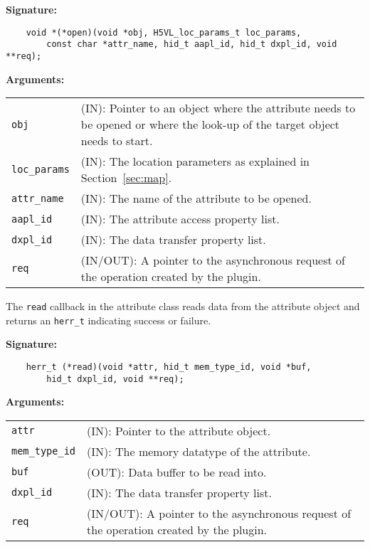 \begin{mdframed}[style=bgbox]
\textbf{Signature:}
\begin{lstlisting}
    void *(*open)(void *obj, H5VL_loc_params_t loc_params, 
        const char *attr_name, hid_t aapl_id, hid_t dxpl_id, void **req);
\end{lstlisting}

\textbf{Arguments:}\\
\begin{tabular}{l p{13.5cm}}
  \texttt{obj} & (IN): Pointer to an object where the attribute needs to be
  opened or where the look-up of the target object needs to start.\\
  \texttt{loc\_params} & (IN): The location parameters as explained in
  Section~\ref{sec:map}.\\
  \texttt{attr\_name} & (IN): The name of the attribute to be opened.\\
  \texttt{aapl\_id} & (IN): The attribute access property list.\\
  \texttt{dxpl\_id} & (IN): The data transfer property list.\\
  \texttt{req} & (IN/OUT): A pointer to the asynchronous request of the
  operation created by the plugin.\\
\end{tabular}
\end{mdframed}

The \texttt{read} callback in the attribute class reads data from
the attribute object and returns an \texttt{herr\_t} indicating success or
failure.\bigskip

\begin{mdframed}[style=bgbox]
\textbf{Signature:}
\begin{lstlisting}
    herr_t (*read)(void *attr, hid_t mem_type_id, void *buf, 
        hid_t dxpl_id, void **req);
\end{lstlisting}

\textbf{Arguments:}\\
\begin{tabular}{l p{13.5cm}}
  \texttt{attr} & (IN): Pointer to the attribute object.\\
  \texttt{mem\_type\_id} & (IN): The memory datatype of the attribute.\\
  \texttt{buf} & (OUT): Data buffer to be read into.\\
  \texttt{dxpl\_id} & (IN): The data transfer property list.\\
  \texttt{req} & (IN/OUT): A pointer to the asynchronous request of the
  operation created by the plugin.\\
\end{tabular}
\end{mdframed}

